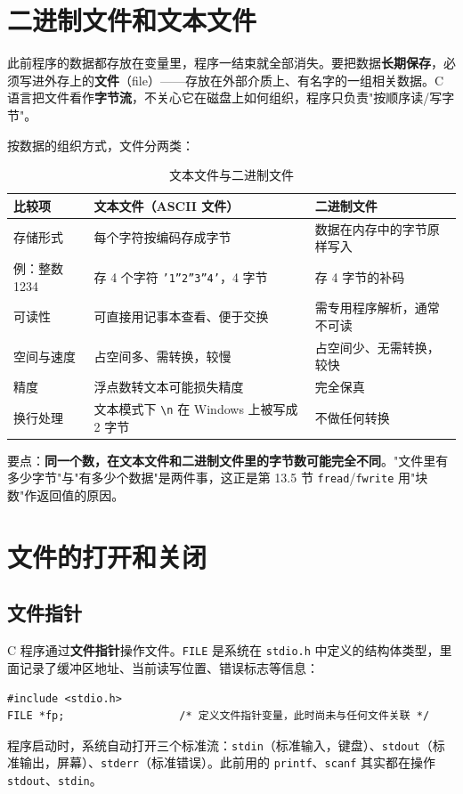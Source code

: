 
\section{二进制文件和文本文件}
此前程序的数据都存放在变量里，程序一结束就全部消失。要把数据\textbf{长期保存}，必须写进外存上的\textbf{文件}（file）——存放在外部介质上、有名字的一组相关数据。C 语言把文件看作\textbf{字节流}，不关心它在磁盘上如何组织，程序只负责"按顺序读/写字节"。

按数据的组织方式，文件分两类：

\begin{table}[htbp]
\centering
\caption{文本文件与二进制文件}
\footnotesize
\begin{tabularx}{\textwidth}{@{}p{2.6cm}p{4.6cm}X@{}}
\toprule
比较项 & 文本文件（ASCII 文件） & 二进制文件 \\
\midrule
存储形式 & 每个字符按编码存成字节 & 数据在内存中的字节原样写入 \\
例：整数 1234 & 存 4 个字符 \texttt{'1''2''3''4'}，4 字节 & 存 4 字节的补码 \\
可读性 & 可直接用记事本查看、便于交换 & 需专用程序解析，通常不可读 \\
空间与速度 & 占空间多、需转换，较慢 & 占空间少、无需转换，较快 \\
精度 & 浮点数转文本可能损失精度 & 完全保真 \\
换行处理 & 文本模式下 \texttt{\textbackslash n} 在 Windows 上被写成 2 字节 & 不做任何转换 \\
\bottomrule
\end{tabularx}
\end{table}

要点：\textbf{同一个数，在文本文件和二进制文件里的字节数可能完全不同}。"文件里有多少字节"与"有多少个数据"是两件事，这正是第 13.5 节 \texttt{fread}/\texttt{fwrite} 用"块数"作返回值的原因。

\section{文件的打开和关闭}
\subsection{文件指针}
C 程序通过\textbf{文件指针}操作文件。\texttt{FILE} 是系统在 \texttt{stdio.h} 中定义的结构体类型，里面记录了缓冲区地址、当前读写位置、错误标志等信息：
\begin{lstlisting}
#include <stdio.h>
FILE *fp;                  /* 定义文件指针变量，此时尚未与任何文件关联 */
\end{lstlisting}
程序启动时，系统自动打开三个标准流：\texttt{stdin}（标准输入，键盘）、\texttt{stdout}（标准输出，屏幕）、\texttt{stderr}（标准错误）。此前用的 \texttt{printf}、\texttt{scanf} 其实都在操作 \texttt{stdout}、\texttt{stdin}。

